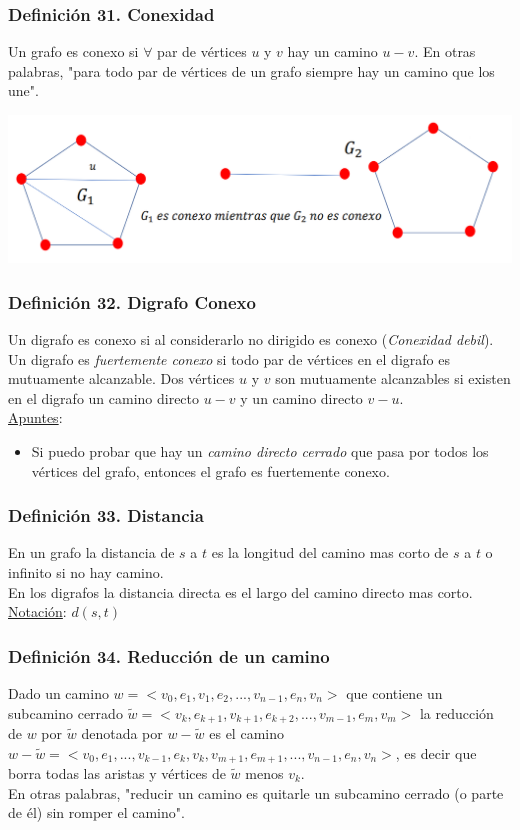 \documentclass{article}
\begin{document}
\subsubsection*{Definición 31. Conexidad}
Un grafo es conexo si $\forall$ par de vértices $u$ y $v$ hay un camino $u-v$. 
En otras palabras, "para todo par de vértices de un grafo siempre hay un camino que los une".
\begin{center}
    \includegraphics[width=.60\textwidth]{grafosConexos.PNG}
\end{center}

\subsubsection*{Definición 32. Digrafo Conexo}
Un digrafo es conexo si al considerarlo no dirigido es conexo (\emph{Conexidad debil}).
Un digrafo es \emph{fuertemente conexo} si todo par de vértices en el digrafo es mutuamente alcanzable.
Dos vértices $u$ y $v$ son mutuamente alcanzables si existen en el digrafo un camino directo $u - v$ y un camino directo $v - u$.
\\\underline{Apuntes}:
\begin{itemize}
    \item Si puedo probar que hay un \emph{camino directo cerrado} que pasa por todos los vértices del grafo, entonces el grafo es fuertemente conexo.
\end{itemize}

\subsubsection*{Definición 33. Distancia}
En un grafo la distancia de $s$ a $t$ es la longitud del camino mas corto de $s$ a $t$ o infinito si no hay camino.
\\En los digrafos la distancia directa es el largo del camino directo mas corto.
\\\underline{Notación}: $d(s,t)$

\subsubsection*{Definición 34. Reducción de un camino}
Dado un camino $w =<v_0,e_1,v_1,e_2,...,v_{n-1},e_n,v_n>$ que contiene un subcamino cerrado $\widetilde{w}=< v_k,e_{k+1},v_{k+1},e_{k+2},...,v_{m-1},e_m,v_m>$ la reducción de $w$ por $\widetilde{w}$ denotada por $w-\widetilde{w}$ es el camino $w-\widetilde{w}=<v_0,e_1,...,v_{k-1},e_k,v_k,v_{m+1},e_{m+1},...,v_{n-1},e_n,v_n>$, 
es decir que borra todas las aristas y vértices de $\widetilde{w}$ menos $v_k$.
\\En otras palabras, "reducir un camino es quitarle un subcamino cerrado (o parte de él) sin romper el camino".
\end{document}
